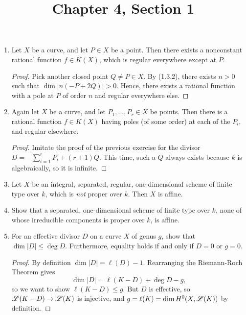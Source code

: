 \documentclass{article}
\title{Chapter 4, Section 1}
\begin{document}
\maketitle
\begin{enumerate} [label=\textbf{\arabic*.}, leftmargin=0em]

\item Let $X$ be a curve, and let $P \in X$ be a point.
Then there exists a nonconstant  rational function $f \in K(X)$, which is regular everywhere except at $P$.

\begin{proof}
  Pick another closed point $Q \neq P \in X$.
  By (1.3.2), there exists $n > 0 $ such that $\dim|n(-P + 2Q)| > 0$.
  Hence, there exists a rational function with a pole at $P$ of order $n$ and regular everywhere else.
\end{proof}

\item Again let $X$ be a curve, and let $P_1, \dots, P_r \in X$ be points.
Then there is a rational function $f \in K(X)$ having poles (of some order) at each of the $P_i$, and regular elsewhere.

\begin{proof}
  Imitate the proof of the previous exercise for the divisor $D = -\sum_{i = 1}^r P_i + (r + 1)Q$. This time, such a $Q$ always exists because $k$ is algebraically, so it is infinite.
\end{proof}

\item Let $X$ be an integral, separated, regular, one-dimensional scheme of finite type over $k$, which is \textit{not} proper over $k$.
Then $X$ is affine.

\item Show that a separated, one-dimensional scheme of finite type over $k$, none of whose irreducible components is proper over $k$, is affine.

\item For an effective divisor $D$ on a curve $X$ of genus $g$, show that $\dim{|D|} \leq \deg{D}$.
Furthermore, equality holds if and only if $D = 0$ or $g = 0$.

\begin{proof}
  By definition $\dim|D| = \ell(D) - 1$. Rearranging the Riemann-Roch Theorem gives
  \begin{equation*}
    \dim{|D|} = \ell(K - D) + \deg{D} - g,
  \end{equation*}
  so we want to show $\ell(K - D) \leq g$. But $D$ is effective, so $\mathscr{L}(K - D) \to \mathscr{L}(K)$ is injective, and $g = \ell(K) = \dim{H^0(X, \mathscr{L}(K))}$ by definition.
\end{proof}


\end{enumerate}
\end{document}
